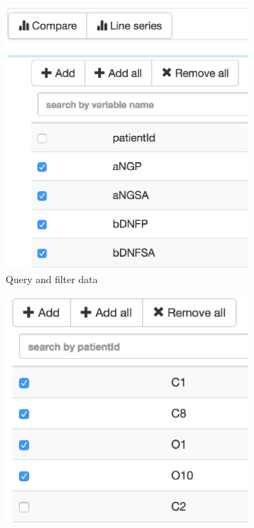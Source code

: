 \documentclass[]{spie}  %
\begin{document}
\begin{figure}
	\centering 
	\begin{subfigure}{0.3\textwidth}
    	\includegraphics[width=\textwidth]{QueryAndFilterImportedDataOut.eps}
    	\caption{Query and filter data}
    	\label{fig:QueryAndFilterImportedData}
	\end{subfigure}
	\begin{subfigure}{0.3\textwidth}
    	\includegraphics[width=\textwidth]{SelectPatientsOut.eps}

\end{subfigure}
\end{figure}
\end{document}
